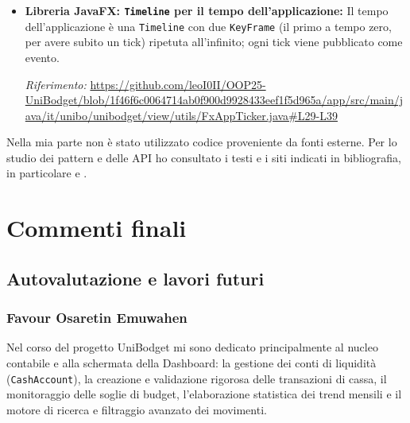 \documentclass[11pt,a4paper,openright]{report}
\begin{document}
\begin{itemize}[itemsep=5pt,topsep=3pt]
    \item \textbf{Libreria JavaFX: \texttt{Timeline} per il tempo dell'applicazione:} Il tempo dell'applicazione è una \texttt{Timeline} con due \texttt{KeyFrame} (il primo a tempo zero, per avere subito un tick) ripetuta all'infinito; ogni tick viene pubblicato come evento.
    \par\emph{Riferimento:} \url{https://github.com/leoI0II/OOP25-UniBodget/blob/1f46f6c0064714ab0f900d9928433eef1f5d965a/app/src/main/java/it/unibo/unibodget/view/utils/FxAppTicker.java#L29-L39}
\end{itemize}

\noindent
Nella mia parte non è stato utilizzato codice proveniente da fonti esterne. Per lo studio dei pattern e delle API ho consultato i testi e i siti indicati in bibliografia, in particolare \cite{Horstmann} e \cite{RefactoringGuru}.

\chapter{Commenti finali}

\section{Autovalutazione e lavori futuri}

\subsection{Favour Osaretin Emuwahen}
Nel corso del progetto UniBodget mi sono dedicato principalmente al nucleo contabile e alla schermata della Dashboard: la gestione dei conti di liquidità (\texttt{CashAccount}), la creazione e validazione rigorosa delle transazioni di cassa, il monitoraggio delle soglie di budget, l'elaborazione statistica dei trend mensili e il motore di ricerca e filtraggio avanzato dei movimenti.
\end{document}
